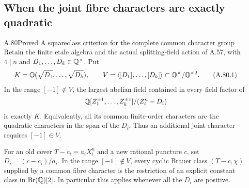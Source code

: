 \subsection{When the joint fibre characters are exactly quadratic}

\begin{statement}{A.80}{Proved}
{A squareclass criterion for the complete common character group}
Retain the finite etale algebra and the actual splitting-field
action of A.57, with $4\mid n$ and $D_1,\ldots,D_k\in\mathbb Q^\times$.
Put
\[
 K=\mathbb Q(\sqrt{D_1},\ldots,\sqrt{D_k}),\qquad
 V=\langle[D_1],\ldots,[D_k]\rangle
                      \subset\mathbb Q^\times/\mathbb Q^{\times2}.
 \tag{A.80.1}
\]
In the range $[-1]\notin V$, the largest abelian field contained in
every field factor of
\[
             \mathbb Q[Z_1^{\pm1},\ldots,Z_k^{\pm1}]/(Z_i^n-D_i)
\]
is exactly $K$.
Equivalently, all its common finite-order characters are the
quadratic characters in the span of the $D_i$.
Thus an additional joint character requires
$[-1]\in V$.

For an old cover $T-c_i=a_iX_i^n$ and a new rational puncture $c$,
set $D_i=(c-c_i)/a_i$.  In the range $[-1]\notin V$, every
cyclic Brauer class $(T-c,\chi)$ supplied by a common fibre
character is the restriction of an explicit constant class
in $\operatorname{Br}(\mathbb Q)[2]$.
In particular this applies whenever all the $D_i$ are positive.
\end{statement}
